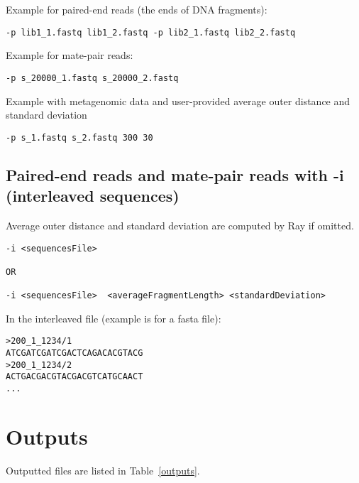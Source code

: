 \documentclass{article}
\begin{document}
Example for paired-end reads (the ends of DNA fragments):

\begin{verbatim}
-p lib1_1.fastq lib1_2.fastq -p lib2_1.fastq lib2_2.fastq
\end{verbatim}

Example for mate-pair reads:

\begin{verbatim}
-p s_20000_1.fastq s_20000_2.fastq
\end{verbatim}

Example with metagenomic data and user-provided average outer distance and standard deviation

\begin{verbatim}
-p s_1.fastq s_2.fastq 300 30
\end{verbatim}

\subsection{Paired-end reads and mate-pair reads with -i (interleaved sequences)}


Average outer distance and standard deviation are computed by Ray if omitted.

\begin{verbatim}
-i <sequencesFile>

OR

-i <sequencesFile>  <averageFragmentLength> <standardDeviation> 
\end{verbatim}

In the interleaved file (example is for a fasta file):

\begin{verbatim}
>200_1_1234/1
ATCGATCGATCGACTCAGACACGTACG
>200_1_1234/2
ACTGACGACGTACGACGTCATGCAACT
...
\end{verbatim}



\section{Outputs}

Outputted files are listed in Table~\ref{outputs}.
\end{document}
